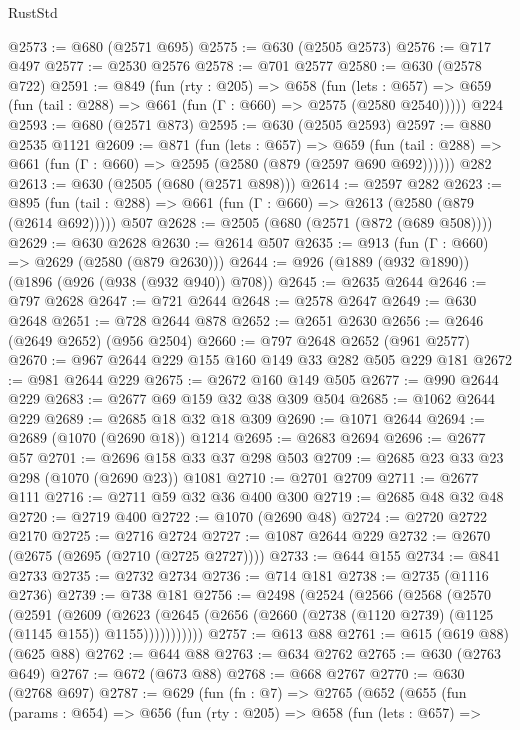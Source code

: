\begin{lexlean}{RustStd}
\begin{coremodule}
@2573 := @680 (@2571 @695)
@2575 := @630 (@2505 @2573)
@2576 := @717 @497
@2577 := @2530 @2576
@2578 := @701 @2577
@2580 := @630 (@2578 @722)
@2591 := @849
    (fun (rty : @205) =>
    @658
      (fun (lets : @657) =>
      @659 (fun (tail : @288) => @661 (fun (Γ : @660) => @2575 (@2580 @2540)))))
    @224
@2593 := @680 (@2571 @873)
@2595 := @630 (@2505 @2593)
@2597 := @880 @2535 @1121
@2609 := @871
    (fun (lets : @657) =>
    @659 (fun (tail : @288) => @661 (fun (Γ : @660) => @2595 (@2580 (@879 (@2597 @690 @692))))))
    @282
@2613 := @630 (@2505 (@680 (@2571 @898)))
@2614 := @2597 @282
@2623 := @895 (fun (tail : @288) => @661 (fun (Γ : @660) => @2613 (@2580 (@879 (@2614 @692))))) @507
@2628 := @2505 (@680 (@2571 (@872 (@689 @508))))
@2629 := @630 @2628
@2630 := @2614 @507
@2635 := @913 (fun (Γ : @660) => @2629 (@2580 (@879 @2630)))
@2644 := @926 (@1889 (@932 @1890)) (@1896 (@926 (@938 (@932 @940)) @708))
@2645 := @2635 @2644
@2646 := @797 @2628
@2647 := @721 @2644
@2648 := @2578 @2647
@2649 := @630 @2648
@2651 := @728 @2644 @878
@2652 := @2651 @2630
@2656 := @2646 (@2649 @2652) (@956 @2504)
@2660 := @797 @2648 @2652 (@961 @2577)
@2670 := @967 @2644 @229 @155 @160 @149 @33 @282 @505 @229 @181
@2672 := @981 @2644 @229
@2675 := @2672 @160 @149 @505
@2677 := @990 @2644 @229
@2683 := @2677 @69 @159 @32 @38 @309 @504
@2685 := @1062 @2644 @229
@2689 := @2685 @18 @32 @18 @309
@2690 := @1071 @2644
@2694 := @2689 (@1070 (@2690 @18)) @1214
@2695 := @2683 @2694
@2696 := @2677 @57
@2701 := @2696 @158 @33 @37 @298 @503
@2709 := @2685 @23 @33 @23 @298 (@1070 (@2690 @23)) @1081
@2710 := @2701 @2709
@2711 := @2677 @111
@2716 := @2711 @59 @32 @36 @400 @300
@2719 := @2685 @48 @32 @48
@2720 := @2719 @400
@2722 := @1070 (@2690 @48)
@2724 := @2720 @2722 @2170
@2725 := @2716 @2724
@2727 := @1087 @2644 @229
@2732 := @2670 (@2675 (@2695 (@2710 (@2725 @2727))))
@2733 := @644 @155
@2734 := @841 @2733
@2735 := @2732 @2734
@2736 := @714 @181
@2738 := @2735 (@1116 @2736)
@2739 := @738 @181
@2756 := @2498
    (@2524
      (@2566
        (@2568
          (@2570
            (@2591
              (@2609
                (@2623
                  (@2645 (@2656 (@2660 (@2738 (@1120 @2739) (@1125 (@1145 @155)) @1155)))))))))))
@2757 := @613 @88
@2761 := @615 (@619 @88) (@625 @88)
@2762 := @644 @88
@2763 := @634 @2762
@2765 := @630 (@2763 @649)
@2767 := @672 (@673 @88)
@2768 := @668 @2767
@2770 := @630 (@2768 @697)
@2787 := @629
    (fun (fn : @7) =>
    @2765
      (@652
        (@655
          (fun (params : @654) =>
          @656
            (fun (rty : @205) =>
            @658
              (fun (lets : @657) =>

\end{coremodule}
\end{lexlean}
